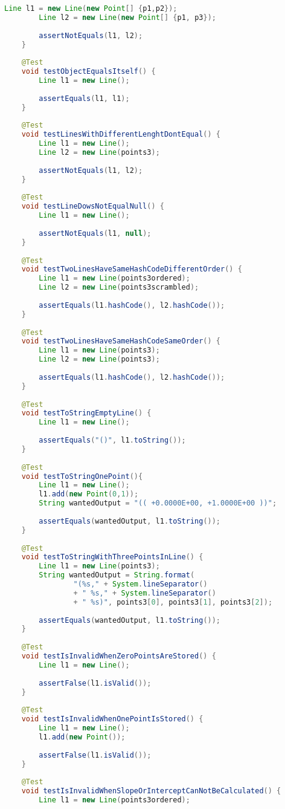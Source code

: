 \begin{lstlisting}[language=java,
    label=lst:linetest,
    caption=JUnit Tests for Line
]
		Line l1 = new Line(new Point[] {p1,p2});
		Line l2 = new Line(new Point[] {p1, p3});
		
		assertNotEquals(l1, l2);
	}
	
	@Test
	void testObjectEqualsItself() {
		Line l1 = new Line();
		
		assertEquals(l1, l1);
	}
	
	@Test
	void testLinesWithDifferentLenghtDontEqual() {
		Line l1 = new Line();
		Line l2 = new Line(points3);
		
		assertNotEquals(l1, l2);
	}
	
	@Test
	void testLineDowsNotEqualNull() {
		Line l1 = new Line();
		
		assertNotEquals(l1, null);
	}
	
	@Test
	void testTwoLinesHaveSameHashCodeDifferentOrder() {
		Line l1 = new Line(points3ordered);
		Line l2 = new Line(points3scrambled);
		
		assertEquals(l1.hashCode(), l2.hashCode());
	}
	
	@Test
	void testTwoLinesHaveSameHashCodeSameOrder() {
		Line l1 = new Line(points3);
		Line l2 = new Line(points3);
		
		assertEquals(l1.hashCode(), l2.hashCode());
	}
	
	@Test
	void testToStringEmptyLine() {
		Line l1 = new Line();
		
		assertEquals("()", l1.toString());
	}
	
	@Test
	void testToStringOnePoint(){
		Line l1 = new Line();
		l1.add(new Point(0,1));
		String wantedOutput = "(( +0.0000E+00, +1.0000E+00 ))";
		
		assertEquals(wantedOutput, l1.toString());
	}
	
	@Test
	void testToStringWithThreePointsInLine() {
		Line l1 = new Line(points3);
		String wantedOutput = String.format(
				"(%s," + System.lineSeparator() 
				+ " %s," + System.lineSeparator()
				+ " %s)", points3[0], points3[1], points3[2]);
		
		assertEquals(wantedOutput, l1.toString());
	}
	
	@Test
	void testIsInvalidWhenZeroPointsAreStored() {
		Line l1 = new Line();
		
		assertFalse(l1.isValid());
	}
	
	@Test
	void testIsInvalidWhenOnePointIsStored() {
		Line l1 = new Line();
		l1.add(new Point());
		
		assertFalse(l1.isValid());
	}
	
	@Test
	void testIsInvalidWhenSlopeOrInterceptCanNotBeCalculated() {
		Line l1 = new Line(points3ordered);
		

\end{lstlisting}
